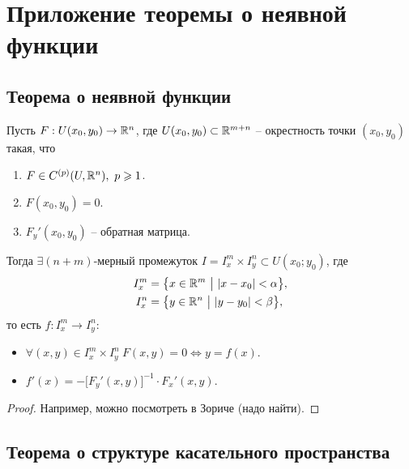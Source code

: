 \section{Приложение теоремы о неявной функции}

\setcounter{subsection}{17}

\subsection{Теорема о неявной функции}

\begin{theorem}
    Пусть $ F:U(x_0,y_0) \rightarrow \mathbb{R}^n $, где $ U(x_0,y_0) \subset \mathbb{R}^{m+n} $ -- окрестность точки $ (x_0,y_0) $ такая, что
    \begin{enumerate}
        \item $ F\in C^{(p)}(U,\mathbb{R}^n), \ p \geqslant 1 $.
        \item $ F(x_0,y_0) = 0 $.
        \item $ F_y'(x_0,y_0) $ -- обратная матрица.
    \end{enumerate}

    Тогда $ \exists (n+m) $-мерный промежуток $ I = I_x^m \times I_y^n \subset U(x_0;y_0) $, где
    \begin{align*}
        I_x^m & = \big\{x\in \mathbb{R}^m \ \big| \ |x - x_0| < \alpha \big\}, \\
        I_x^n & = \big\{y\in \mathbb{R}^n \ \big| \ |y - y_0| < \beta \big\},
    \end{align*} то есть $ f:I_x^m \rightarrow I_y^n $:
    \begin{itemize}
        \item $ \forall (x,y) \in I_x^m \times I_y^n \ F(x,y) = 0 \iff y = f(x) $.
        \item $ f'(x) = -\big[F_y'(x,y)\big]^{-1} \cdot F_x'(x,y) $.
    \end{itemize}
\end{theorem}

\begin{proof}
    Например, можно посмотреть в Зориче (надо найти).
\end{proof}

\setcounter{subsection}{21}

\subsection{Теорема о структуре касательного пространства}

